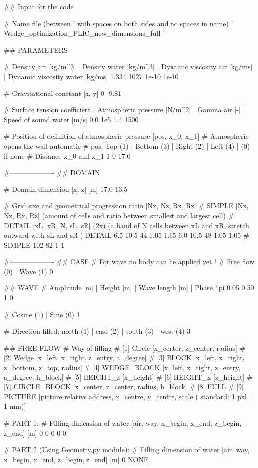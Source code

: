 ## Input for the code

# Name file (between ' with spaces on both sides and no spaces in name)
' Wedge_optimization_PLIC_new_dimensions_full '

## PARAMETERS

# Density air [kg/m^3] | Density water [kg/m^3] | Dynamic viscosity air [kg/ms] | Dynamic viscosity water [kg/ms]
1.334 1027 1e-10 1e-10

# Gravitational constant [x, y]
0 -9.81

# Surface tension coefficient | Atmospheric pressure [N/m^2] | Gamma air [-]	| Speed of sound water [m/s]
0.0 	1e5 	1.4		1500

# Position of definition of atmospheric pressure [pos, x_0, x_1]
# Atmospheric opens the wall automatic
# pos: Top (1)	| Bottom (3)	| Right (2)		| Left (4) | (0) if none
# Distance x_0 and x_1
1 0 17.0

#-------------------
## DOMAIN

# Domain dimension [x, z] [m]
17.0 13.5

# Grid size and geometrical progression ratio [Nx, Nz, Rx, Rz]
# SIMPLE [Nx, Nz, Rx, Rz] (amount of cells and ratio between smallest and largest cell)
# DETAIL [xL, xR, N, sL, sR] (2x) (a band of N cells between xL and xR, stretch outward with sL and sR )
DETAIL 6.5 10.5 44 1.05 1.05 6.0 10.5 48 1.05 1.05
# SIMPLE 102 82 1 1

#-------------------
## CASE
# For wave no body can be applied yet !
# Free flow (0)	| Wave (1)
0

## WAVE
# Amplitude [m] | Height [m]	| Wave length [m]	| Phase *pi
0.05 	0.50		1		0

# Cosine (1)	| Sine (0)
1

# Direction filled: north (1)	| east (2)	|	south (3)	| west (4)
3

## FREE FLOW
# Way of filling
# [1] Circle        [x_center, z_center, radius]
# [2] Wedge         [x_left, x_right, z_entry, a_degree]
# [3] BLOCK 		[x_left, x_right, z_bottom, z_top, radius]
# [4] WEDGE_BLOCK   [x_left, x_right, z_entry, a_degree, h_block]
# [5] HEIGHT_z      [x_height]
# [6] HEIGHT_x      [z_height]
# [7] CIRCLE_BLOCK  [x_center, z_center, radius, h_block]
# [8] FULL
# [9] PICTURE		[picture relative address, x_centre, y_centre, scale ( standard: 1 pxl = 1 mm)]

# PART 1:
# Filling dimension of water [air, way, x_begin, x_end, z_begin, z_end] [m]
0 0 0 0 0

# PART 2 (Using Geometry.py module):
# Filling dimension of water [air, way, x_begin, x_end, z_begin, z_end] [m]
0 NONE

